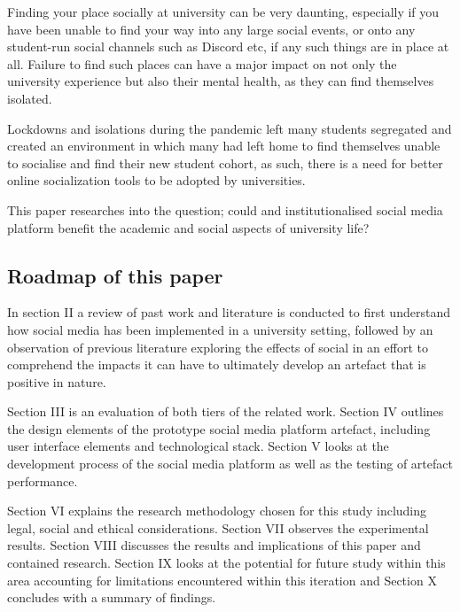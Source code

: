\documentclass[lettersize,journal]{IEEEtran}
\begin{document}
    Finding your place socially at university can be very daunting, especially if you have been unable to find
    your way into any large social events, or onto any student-run social channels such as Discord \cite{Discord} etc, if any
    such things are in place at all. Failure to find such places can have a major impact on not only the university
    experience but also their mental health, as they can find themselves isolated.

    Lockdowns and isolations during the pandemic left many students segregated and created an environment in which
    many had left home to find themselves unable to socialise and find their new student cohort, as such, there is a need for better online socialization tools to be adopted by universities.

    This paper researches into the question; could and institutionalised social media platform benefit the academic and social aspects of university life?

 \subsection{Roadmap of this paper}
    In section II a review of past work and literature is conducted to first understand how social media has been implemented in a university setting, followed by an observation of 
    previous literature exploring the effects of social in an effort to comprehend the impacts it can have to ultimately develop an artefact that is positive in nature.

    Section III is an evaluation of both tiers of the related work.
    Section IV outlines the design elements of the prototype social media platform artefact, including user interface elements 
    and technological stack. Section V looks at the development process of the social media platform as well as the testing of artefact performance.

    Section VI explains the research methodology chosen for this 
    study including legal, social and ethical considerations. Section VII observes the experimental results. Section VIII discusses the results and implications of this paper and contained research. 
	Section IX looks at the potential for future study within this area accounting for limitations encountered within this iteration and Section X concludes with a summary of findings.
\end{document}
